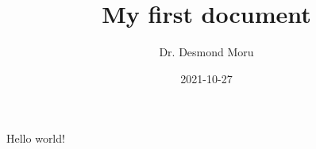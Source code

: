\documentclass{article}
\title{My first document}
\date{2021-10-27}
\author{Dr. Desmond Moru}
\begin{document}
	\maketitle
	\newpage
	Hello world!
\end{document}
